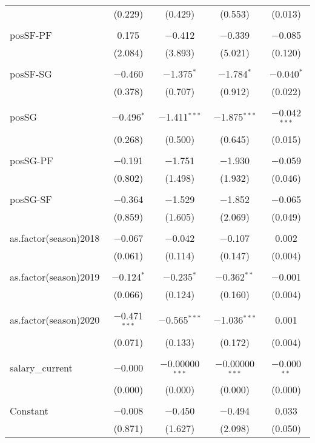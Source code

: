 \documentclass[a4paper,11pt]{article}
\begin{document}
\begin{table}[!htbp]
{\begin{tabular}{@{\extracolsep{5pt}}lcccc}
  & (0.229) & (0.429) & (0.553) & (0.013) \\ 
  & & & & \\ 
 posSF-PF & 0.175 & $-$0.412 & $-$0.339 & $-$0.085 \\ 
  & (2.084) & (3.893) & (5.021) & (0.120) \\ 
  & & & & \\ 
 posSF-SG & $-$0.460 & $-$1.375$^{*}$ & $-$1.784$^{*}$ & $-$0.040$^{*}$ \\ 
  & (0.378) & (0.707) & (0.912) & (0.022) \\ 
  & & & & \\ 
 posSG & $-$0.496$^{*}$ & $-$1.411$^{***}$ & $-$1.875$^{***}$ & $-$0.042$^{***}$ \\ 
  & (0.268) & (0.500) & (0.645) & (0.015) \\ 
  & & & & \\ 
 posSG-PF & $-$0.191 & $-$1.751 & $-$1.930 & $-$0.059 \\ 
  & (0.802) & (1.498) & (1.932) & (0.046) \\ 
  & & & & \\ 
 posSG-SF & $-$0.364 & $-$1.529 & $-$1.852 & $-$0.065 \\ 
  & (0.859) & (1.605) & (2.069) & (0.049) \\ 
  & & & & \\ 
 as.factor(season)2018 & $-$0.067 & $-$0.042 & $-$0.107 & 0.002 \\ 
  & (0.061) & (0.114) & (0.147) & (0.004) \\ 
  & & & & \\ 
 as.factor(season)2019 & $-$0.124$^{*}$ & $-$0.235$^{*}$ & $-$0.362$^{**}$ & $-$0.001 \\ 
  & (0.066) & (0.124) & (0.160) & (0.004) \\ 
  & & & & \\ 
 as.factor(season)2020 & $-$0.471$^{***}$ & $-$0.565$^{***}$ & $-$1.036$^{***}$ & 0.001 \\ 
  & (0.071) & (0.133) & (0.172) & (0.004) \\ 
  & & & & \\ 
 salary\_current & $-$0.000 & $-$0.00000$^{***}$ & $-$0.00000$^{***}$ & $-$0.000$^{**}$ \\ 
  & (0.000) & (0.000) & (0.000) & (0.000) \\ 
  & & & & \\ 
 Constant & $-$0.008 & $-$0.450 & $-$0.494 & 0.033 \\ 
  & (0.871) & (1.627) & (2.098) & (0.050) \\ 

\end{tabular}}
\end{table}
\end{document}
